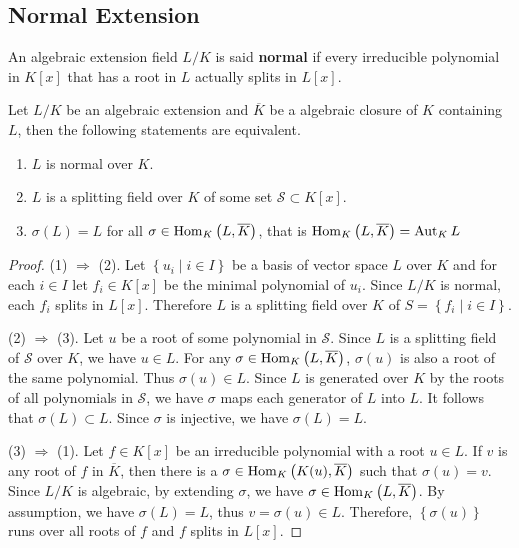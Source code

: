 \subsection{Normal Extension }
\begin{definition}
    An algebraic extension field $L/K$ is said \textbf{normal}
    if every irreducible polynomial in $K[x]$ that has a root in $L$ actually splits in $L[x]$.
\end{definition}
\begin{theorem}
    Let $L/K$ be an algebraic extension and $\overline{K}$ be a algebraic closure of $K$ containing $L$, then the following statements are equivalent.
    \begin{enumerate}
        \item
              $L$ is normal over $K$.

        \item
              $L$ is a splitting field over $K$ of some set $\mathcal{S} \subset K[x]$.

        \item
              $\sigma(L)=L$ for all $\sigma\in \operatorname{\operatorname{Hom}}_{K}\left( L,\overline{K} \right)$, that is $\operatorname{\operatorname{Hom}}_{K}\left( L,\overline{K}\right)=\operatorname{\operatorname{Aut}}_K L$
    \end{enumerate}
    \begin{proof}
        (1) $\Rightarrow$ (2).
        Let $\left\{u_i \mid i \in I\right\}$ be a basis of vector space $L$ over $K$ and for each $i \in I$ let $f_i \in K[x]$ be the minimal polynomial of $u_i$. Since $L/K$ is normal, each $f_i$ splits in $L[x]$. Therefore $L$ is a splitting field over $K$ of $S=\left\{f_i \mid i \in I\right\}$.

        (2) $\Rightarrow$ (3).
        Let $u$ be a root of some polynomial in $\mathcal{S}$.
        Since $L$ is a splitting field of $\mathcal{S}$ over $K$, we have $u \in L$.
        For any $\sigma \in \operatorname{\operatorname{Hom}}_{K}\left(L, \overline{K}\right)$, $\sigma(u)$ is also a root of the same polynomial.
        Thus $\sigma(u) \in L$.
        Since $L$ is generated over $K$ by the roots of all polynomials in $\mathcal{S}$, we have $\sigma$ maps each generator of $L$ into $L$.
        It follows that $\sigma(L) \subset L$.
        Since $\sigma$ is injective, we have $\sigma(L)=L$.

        (3) $\Rightarrow$ (1).
        Let $f \in K[x]$ be an irreducible polynomial with a root $u \in L$.
        If $v$ is any root of $f$ in $\overline{K}$, then there is a $\sigma \in \operatorname{\operatorname{Hom}}_{K}\left(K(u), \overline{K}\right)$ such that $\sigma(u)=v$.
        Since $L/K$ is algebraic, by extending $\sigma$, we have $\sigma \in \operatorname{\operatorname{Hom}}_{K}\left(L, \overline{K}\right)$.
        By assumption, we have $\sigma(L)=L$, thus $v=\sigma(u) \in L$.
        Therefore, $\left\{\sigma(u)\right\}$ runs over all roots of $f$ and $f$ splits in $L[x]$.
    \end{proof}
\end{theorem}


